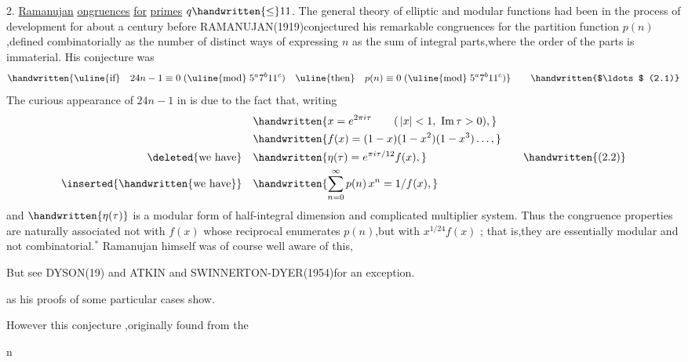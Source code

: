 \noindent\margin{\handwritten{/}}2. \uline{Ramanujan} \uline{ongruences} \uline{for} \uline{primes} $q\handwritten{\leq}11$. The general theory of elliptic and modular functions had been in the process of development for about a century before RAMANUJAN(1919)conjectured his remarkable congruences for the partition function \uline{$p(n)$},defined combinatorially as the number of distinct ways of expressing \uline{$n$} as the sum of integral parts,where the order of the parts is immaterial. His conjecture was
\[
\handwritten{\text{\uline{if}}\quad 24n-1\equiv0\;(\text{\uline{mod}}\;5^{a}7^{b}11^{c})\quad
\text{\uline{then}}\quad p(n)\equiv0\;(\text{\uline{mod}}\;5^{a}7^{b}11^{c})}
\tag*{\handwritten{$\ldots$ (2.1)}}
\]
The curious appearance of $24n-1$ in  is due to the fact that, writing
\[
\begin{aligned}
&\handwritten{x=e^{2\pi i\tau}\qquad (\,|x|<1,\ \mathrm{Im}\,\tau>0),}\\
&\handwritten{f(x)=(1-x)(1-x^{2})(1-x^{3})\ldots,}\\
\text{\deleted{we have}}\quad &\handwritten{\eta(\tau)=e^{\pi i\tau/12}f(x),}\\
\text{\inserted{\handwritten{we have}}}\quad &\handwritten{\sum_{n=0}^{\infty}p(n)\,x^{n}=1/f(x),}
\end{aligned}
\tag*{\handwritten{(2.2)}}
\]
and $\handwritten{\eta(\tau)}$ is a modular form of half-integral dimension and complicated multiplier system. Thus the congruence properties are naturally associated not with \uline{$f(x)$} whose reciprocal enumerates \uline{$p(n)$},but with \uline{$x^{1/24}f(x)$} ; that is,they are essentially modular and not combinatorial.$^{*}$ Ramanujan himself was of course well aware of this,

\noindent\handwritten{\rule{\linewidth}{0.4pt}}

\noindent{}

\noindent *But see DYSON(19) and ATKIN and SWINNERTON-DYER(1954)for an exception.

\noindent\handwritten{\rule{\linewidth}{0.4pt}}

\noindent as his proofs of some particular cases show.

However this conjecture ,originally found from the


\noindent\hfill {}n 

